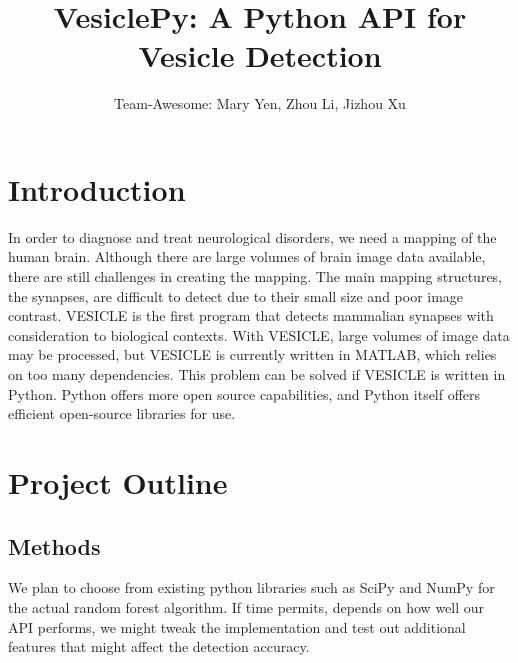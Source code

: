 \documentclass[11pt]{article} %
\title{VesiclePy: A Python API for Vesicle Detection}
\author{Team-Awesome: Mary Yen, Zhou Li, Jizhou Xu}
\begin{document}
\maketitle

\section{Introduction}

In order to diagnose and treat neurological disorders, we need a mapping of the human brain. Although there are large volumes of brain image data available, there are still challenges in creating the mapping. The main mapping structures, the synapses, are difficult to detect due to their small size and poor image contrast. VESICLE is the first program that detects mammalian synapses with consideration to biological contexts. With VESICLE, large volumes of image data may be processed, but VESICLE is currently written in MATLAB, which relies on too many dependencies. This problem can be solved if VESICLE is written in Python. Python offers more open source capabilities, and Python itself offers efficient open-source libraries for use.

\section{Project Outline}
\subsection{Methods}
We plan to choose from existing python libraries such as SciPy and NumPy for the actual random forest algorithm. If time permits, depends on how well our API performs, we might tweak the implementation and test out additional features that might affect the detection accuracy.
\end{document}
